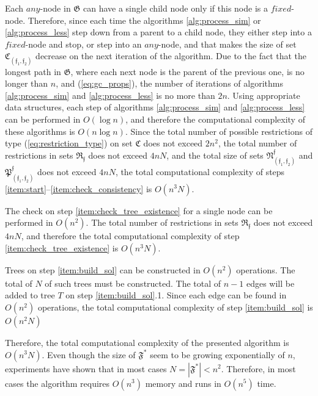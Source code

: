 \documentclass[times, 10pt,twocolumn]{article}
\newcommand{\gC}{\mathfrak{C}}
\newcommand{\gF}{\mathfrak{F}}
\newcommand{\gG}{\mathfrak{G}}
\newcommand{\gR}{\mathfrak{R}}
\newcommand{\gN}{\mathfrak{N}}
\newcommand{\gP}{\mathfrak{P}}
\newcommand{\gf}{\mathfrak{f}}
\newcommand{\gFs}{\gF^*}
\newcommand{\any}{\textit{any}}
\newcommand{\fixed}{\textit{fixed}}
\begin{document}
Each $\any$-node in $\gG$ can have a single child node
only if this node is a $\fixed$-node.
Therefore, since each time
the algorithms \ref{alg:process_sim} or \ref{alg:process_less} step down
from a parent to a child node,
they either step into a $\fixed$-node and stop,
or step into an $\any$-node,
and that makes the size of set $\gC_{(\gf_1, \gf_2)}$ decrease
on the next iteration of the algorithm.
Due to the fact that the longest path in $\gG$,
where each next node is the parent of the previous one,
is no longer than $n$, and (\ref{eq:gc_props}),
the number of iterations of
algorithms \ref{alg:process_sim} and \ref{alg:process_less}
is no more than $2n$.
Using appropriate data structures, each step of
algorithms \ref{alg:process_sim} and \ref{alg:process_less}
can be performed in $O(\log{n})$,
and therefore the computational complexity of
these algorithms is $O(n \log{n})$.
Since the total number of possible restrictions
of type (\ref{eq:restriction_type}) on set $\gC$
does not exceed $2n^2$,
the total number of restrictions in sets $\gR_{\gf}$
does not exceed $4nN$,
and the total size of
sets $\gN^{\gf}_{(\gf_1, \gf_2)}$ and $\gP^{\gf}_{(\gf_1, \gf_2)}$
does not exceed $4nN$,
the total computational complexity
of steps \ref{item:start}--\ref{item:check_consistency} is $O(n^3N)$.

The check on step \ref{item:check_tree_existence} for a single node
can be performed in $O(n^2)$.
The total number of restrictions in sets $\gR_{\gf}$
does not exceed $4nN$,
and therefore the total computational complexity
of step \ref{item:check_tree_existence} is $O(n^3N)$.

Trees on step \ref{item:build_sol} can be constructed
in $O(n^2)$ operations.
The total of $N$ of such trees must be constructed.
The total of $n - 1$ edges will be added to tree $T$
on step \ref{item:build_sol}.1.
Since each edge can be found in $O(n^2)$ operations,
 the total computational complexity of step \ref{item:build_sol} is $O(n^2N)$

Therefore, the total computational complexity
of the presented algorithm is $O(n^3N)$.
Even though the size of $\gFs$ seem to be growing exponentially of $n$,
experiments have shown that in most cases $N = |\gFs| < n^2$.
Therefore, in most cases the algorithm requires $O(n^3)$ memory
and runs in $O(n^5)$ time.

\end{document}
